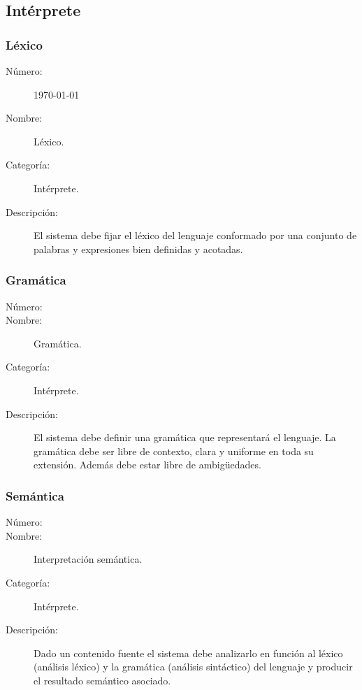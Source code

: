 \subsection{Intérprete}

\subsubsection{Léxico}
\begin{framed}
	\begin{description}
		\item [Número:] \today
		\item [Nombre:] Léxico.
		\item [Categoría:] Intérprete.
		\item [Descripción:] El sistema debe fijar el léxico del lenguaje conformado por una conjunto de palabras y expresiones bien definidas y acotadas.
	\end{description}
\end{framed}

\subsubsection{Gramática}
\begin{framed}
	\begin{description}
		\item [Número:] \cn
		\item [Nombre:] Gramática.
		\item [Categoría:] Intérprete.
		\item [Descripción:] El sistema debe definir una gramática que representará el lenguaje. La gramática debe ser libre de contexto, clara
		y uniforme en toda su extensión. Además debe estar libre de ambigüedades.
	\end{description}
\end{framed}

\subsubsection{Semántica}
\begin{framed}
	\begin{description}
		\item [Número:] \cn
		\item [Nombre:] Interpretación semántica.
		\item [Categoría:] Intérprete.
		\item [Descripción:] Dado un contenido fuente el sistema debe analizarlo en función al léxico (análisis léxico) y la gramática (análisis sintáctico)
		del lenguaje y producir el resultado semántico asociado.
	\end {description}
\end{framed}

